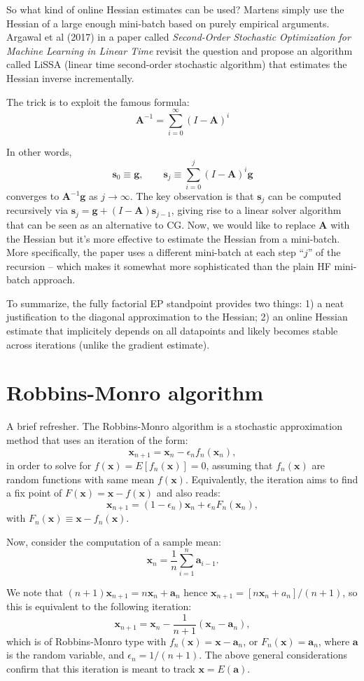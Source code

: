 \documentclass{article}
\def\x{{\mathbf{x}}}
\def\a{{\mathbf{a}}}
\def\s{{\mathbf{s}}}
\def\g{\mathbf{g}}
\def\A{\mathbf{A}}
\begin{document}
So what kind of online Hessian estimates can be used? Martens simply use the Hessian of a large enough mini-batch based on purely empirical arguments. Argawal et al (2017) in a paper called {\em Second-Order Stochastic Optimization for Machine Learning in Linear Time} revisit the question and propose an algorithm called LiSSA (linear time second-order stochastic algorithm) that estimates the Hessian inverse incrementally.

The trick is to exploit the famous formula:
$$
\A^{-1} 
= \sum^{\infty}_{i=0} (I-\A)^i 
$$

In other words,
$$
\s_0 \equiv \g,
\qquad
\s_j \equiv \sum_{i=0}^j (I-\A)^{i}\g
$$
converges to $\A^{-1}\g$ as $j\to\infty$. The key observation is that $\s_j$ can be computed recursively via $\s_j=\g + (I-\A)\s_{j-1}$, giving rise to a linear solver algorithm that can be seen as an alternative to CG. Now, we would like to replace $\A$ with the Hessian but it's more effective to estimate the Hessian from a mini-batch. More specifically, the paper uses a different mini-batch at each step ``$j$'' of the recursion -- which makes it somewhat more sophisticated than the plain HF mini-batch approach.

To summarize, the fully factorial EP standpoint provides two things: 1) a neat justification to the diagonal approximation to the Hessian; 2) an online Hessian estimate that implicitely depends on all datapoints and likely becomes stable across iterations (unlike the gradient estimate).

\section{Robbins-Monro algorithm}

A brief refresher. The Robbins-Monro algorithm is a stochastic approximation method that uses an iteration of the form:
$$
\x_{n+1} = \x_n - \epsilon_n f_n(\x_n)
,
$$
in order to solve for $f(\x)=E[f_n(\x)]=0$, assuming that $f_n(\x)$ are random functions with same mean $f(\x)$. Equivalently, the iteration aims to find a fix point of $F(\x)=\x-f(\x)$ and also reads:
$$
\x_{n+1} = (1-\epsilon_n)\x_n + \epsilon_n F_n(\x_n),
$$
with $F_n(\x)\equiv \x - f_n(\x)$.

Now, consider the computation of a sample mean:
$$
\x_n = \frac{1}{n}\sum_{i=1}^n \a_{i-1}
.
$$

We note that $(n+1)\x_{n+1} = n\x_n + \a_n$ hence $\x_{n+1}=[n\x_n+a_n]/(n+1)$, so this is equivalent to the following iteration:
$$
\x_{n+1} = \x_n - \frac{1}{n+1} (\x_n-\a_n),
$$
which is of Robbins-Monro type with $f_n(\x)=\x-\a_n$, or $F_n(\x)=\a_n$, where $\a$ is the random variable, and $\epsilon_n=1/(n+1)$. The above general considerations confirm that this iteration is meant to track $\x=E(\a)$. 
\end{document}
